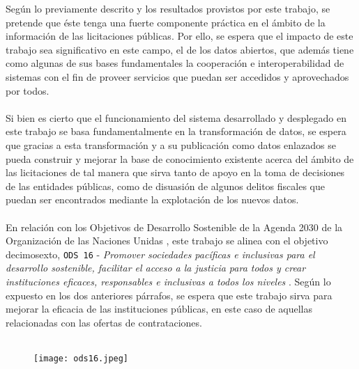 
    Según lo previamente descrito y los resultados provistos por este trabajo, se pretende que éste tenga una fuerte componente práctica en el ámbito de la información de las licitaciones públicas. Por ello, se espera que el impacto de este trabajo sea significativo en este campo, el de los datos abiertos, que además tiene como algunas de sus bases fundamentales la cooperación e interoperabilidad de sistemas con el fin de proveer servicios que puedan ser accedidos y aprovechados por todos.
    \\ \\
    Si bien es cierto que el funcionamiento del sistema desarrollado y desplegado en este trabajo se basa fundamentalmente en la transformación de datos, se espera que gracias a esta transformación y a su publicación como datos enlazados se pueda construir y mejorar la base de conocimiento existente acerca del ámbito de las licitaciones de tal manera que sirva tanto de apoyo en la toma de decisiones de las entidades públicas, como de disuasión de algunos delitos fiscales que puedan ser encontrados mediante la explotación de los nuevos datos.
    \\ \\
    En relación con los Objetivos de Desarrollo Sostenible de la Agenda 2030 de la Organización de las Naciones Unidas \cite{ODS}, este trabajo se alinea con el objetivo decimosexto, \texttt{ODS 16} - \textit{Promover sociedades pacíficas e inclusivas para el desarrollo sostenible, facilitar el acceso a la justicia para todos y crear instituciones eficaces, responsables e inclusivas a todos los niveles} \cite{ODS16}. Según lo expuesto en los dos anteriores párrafos, se espera que este trabajo sirva para mejorar la eficacia de las instituciones públicas, en este caso de aquellas relacionadas con las ofertas de contrataciones.
    \\ \\
    
    \begin{figure}[h]
        \centering
        \texttt{[image: ods16.jpeg]}
    \end{figure}

\newpage